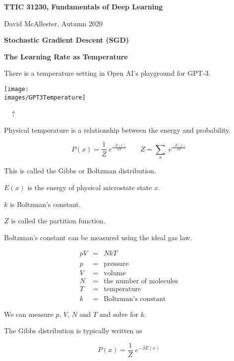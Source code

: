 


\newcommand{\solution}[1]{\bigskip {\bf Solution}: #1}



{\Huge
  \centerline{\bf TTIC 31230, Fundamentals of Deep Learning}
  \bigskip
  \centerline{David McAllester, Autumn 2020}
  \vfill
  \centerline{\bf Stochastic Gradient Descent (SGD)}
  \vfill
  \centerline{\bf The Learning Rate as Temperature}


There is a temperature setting in Open AI's playground for GPT-3.

\vfill
\centerline{\texttt{[image: \\images/GPT3Temperature]}}

~ \hfill $\uparrow$


Physical temperature is a relationship between the energy and probability.

\vfill
$$P(x) = \frac{1}{Z} \;e^{\frac{-E(x)}{kT}} \;\;\;\;\;\;\;Z = \sum_x\; e^{\frac{-E(x)}{kT}}$$

\vfill
This is called the Gibbs or Boltzman distribution.

\vfill
$E(x)$ is the energy of physical microstate state $x$.


\vfill
$k$ is Boltzman's constant.

\vfill
$Z$ is called the partition function.


Boltzman's constant can be measured using the ideal gas law.

\begin{eqnarray*}
pV & = & NkT \\
\\
p & = & \mathrm{pressure} \\
V & = & \mathrm{volume} \\
N & = & \mbox{the number of molecules} \\
T & = & \mathrm{temperature} \\
k & = & \mbox{Boltzman's constant}
\end{eqnarray*}

\vfill
We can measure $p$, $V$, $N$ and $T$ and solve for $k$.



The Gibbs distribution is typically written as

$$P(x) = \frac{1}{Z}\;e^{-\beta E(x)}$$

}
